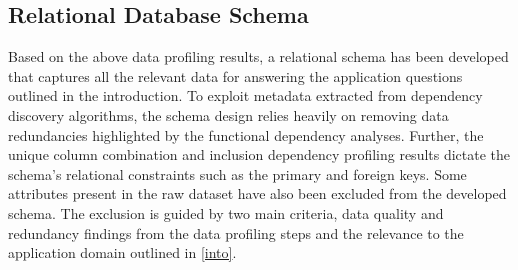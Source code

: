 
\subsection{Relational Database Schema} \label{relational}

Based on the above data profiling results, a relational schema has been developed that captures all the relevant data for answering the application questions outlined in the introduction.
To exploit metadata extracted from dependency discovery algorithms, the schema design relies heavily on removing data redundancies highlighted by the functional dependency analyses.
Further, the unique column combination and inclusion dependency profiling results dictate the schema's relational constraints such as the primary and foreign keys.
Some attributes present in the raw dataset have also been excluded from the developed schema. The exclusion is guided by two main criteria, data quality and redundancy findings from the data profiling steps and the relevance to the application domain outlined in \cref{into}.

